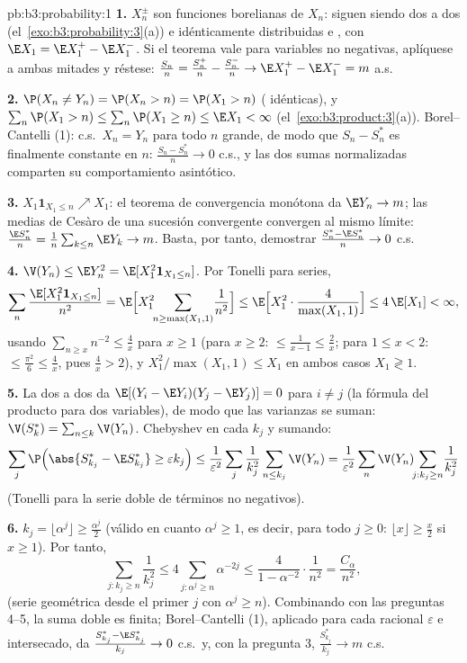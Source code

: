 \begin{solution}{pb:b3:probability:1}
\textbf{1.} $X_n^{\pm}$ son funciones borelianas de $X_n$: siguen siendo
 dos a dos
(el~\cref{exo:b3:probability:3}(a)) e idénticamente distribuidas e
, con $\E X_1 = \E X_1^+ - \E
X_1^-$. Si el teorema vale para variables no negativas, aplíquese a
ambas mitades y réstese:
$\frac{S_n}n = \frac{S_n^+}n - \frac{S_n^-}n \to \E X_1^+ -
\E X_1^- = m$ a.s.

\textbf{2.} $\P(X_n \neq Y_n) = \P(X_n > n) = \P(X_1 > n)$
( idénticas), y
$\sum_n\P(X_1 > n) \leq \sum_n\P(X_1
\geq n) \leq \E X_1 < \infty$ (el~\cref{exo:b3:product:3}(a)).
Borel--Cantelli (1): c.s.\ $X_n = Y_n$ para todo $n$ grande, de modo que
$S_n - S_n^*$ es finalmente constante en $n$:
$\frac{S_n - S_n^*}n \to 0$ c.s., y las dos sumas normalizadas comparten
su comportamiento asintótico.

\textbf{3.} $X_1\mathbf 1_{X_1 \leq n} \nearrow X_1$: el teorema de
convergencia monótona da $\E Y_n \to m$; las medias de Cesàro de una
sucesión convergente convergen al mismo límite: $\frac{\E S_n^*}n =
\frac1n\sum_{k\leq n}\E Y_k \to m$. Basta, por tanto, demostrar
$\frac{S^*_n - \E S^*_n}{n} \to 0$ c.s.

\textbf{4.} $\V(Y_n) \leq \E Y_n^2 = \E[X_1^2\mathbf
1_{X_1\leq n}]$. Por Tonelli para series,
\[
\sum_n\frac{\E[X_1^2\mathbf 1_{X_1\leq n}]}{n^2}
= \E\Bigl[X_1^2\!\!\sum_{n \geq \max(X_1, 1)}\!\frac1{n^2}
\Bigr]
\leq \E\Bigl[X_1^2\cdot\frac{4}{\max(X_1,1)}\Bigr]
\leq 4\,\E[X_1] < \infty,
\]
usando $\sum_{n\geq x}n^{-2} \leq \frac4x$ para $x \geq 1$ (para
$x \geq 2$: $\leq \frac1{x-1} \leq \frac2x$; para $1
\leq x < 2$: $\leq \frac{\pi^2}6 \leq \frac4x$, pues $\frac4x > 2$), y
$X_1^2/\max(X_1, 1) \leq X_1$ en ambos casos $X_1 \gtrless 1$.

\textbf{5.} La 
dos a dos da $\E[(Y_i - \E
Y_i)(Y_j - \E Y_j)] = 0$ para $i \neq j$ (la fórmula del producto para
dos variables), de modo que las varianzas se suman: $\V(S^*_k) =
\sum_{n\leq k}\V(Y_n)$. Chebyshev en cada $k_j$ y sumando:
\[
\sum_j\P\Bigl(\abs{S^*_{k_j} - \E S^*_{k_j}} \geq
\varepsilon k_j\Bigr)
\leq \frac1{\varepsilon^2}\sum_j\frac1{k_j^2}\sum_{n\leq
k_j}\V(Y_n)
= \frac1{\varepsilon^2}\sum_n\V(Y_n)\!\!\sum_{j : k_j\geq
n}\!\frac1{k_j^2}
\]
(Tonelli para la serie doble de términos no negativos).

\textbf{6.} $k_j = \lfloor\alpha^j\rfloor \geq
\frac{\alpha^j}2$ (válido en cuanto $\alpha^j \geq 1$, es decir, para
todo $j \geq 0$: $\lfloor x\rfloor \geq \frac x2$ si $x \geq
1$). Por tanto,
\[
\sum_{j : k_j \geq n}\frac1{k_j^2}
\leq 4\sum_{j : \alpha^j \geq n}\alpha^{-2j}
\leq \frac{4}{1 - \alpha^{-2}}\cdot\frac1{n^2}
= \frac{C_\alpha}{n^2},
\]
(serie geométrica desde el primer $j$ con $\alpha^j \geq
n$). Combinando con las preguntas 4--5, la suma doble es finita;
Borel--Cantelli (1), aplicado para cada racional $\varepsilon$ e
intersecado, da $\frac{S^*_{k_j} - \E S^*_{k_j}}{k_j} \to 0$ c.s.\ y,
con la pregunta 3, $\frac{S^*_{k_j}}{k_j} \to m$ c.s.


\end{solution}
